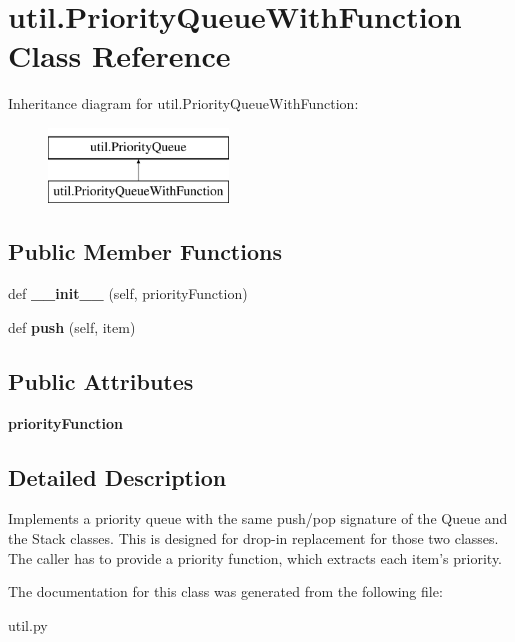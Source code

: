 \hypertarget{classutil_1_1_priority_queue_with_function}{}\section{util.\+Priority\+Queue\+With\+Function Class Reference}
\label{classutil_1_1_priority_queue_with_function}
Inheritance diagram for util.\+Priority\+Queue\+With\+Function\+:\begin{figure}[H]
\begin{center}
\leavevmode
\includegraphics[height=2.000000cm]{classutil_1_1_priority_queue_with_function}
\end{center}
\end{figure}
\subsection*{Public Member Functions}
\begin{DoxyCompactItemize}
\item 
\mbox{\label{classutil_1_1_priority_queue_with_function_a27ea0d044a098275fb4156ac4e35fcc2}} 
def {\bfseries \+\_\+\+\_\+init\+\_\+\+\_\+} (self, priority\+Function)
\item 
\mbox{\label{classutil_1_1_priority_queue_with_function_ababfbf747ff01219b5e03b06f7f30544}} 
def {\bfseries push} (self, item)
\end{DoxyCompactItemize}
\subsection*{Public Attributes}
\begin{DoxyCompactItemize}
\item 
\mbox{\label{classutil_1_1_priority_queue_with_function_a596184d513305b42e0a7a05f75fd7108}} 
{\bfseries priority\+Function}
\end{DoxyCompactItemize}


\subsection{Detailed Description}
\begin{DoxyVerb}Implements a priority queue with the same push/pop signature of the
Queue and the Stack classes. This is designed for drop-in replacement for
those two classes. The caller has to provide a priority function, which
extracts each item's priority.
\end{DoxyVerb}
 

The documentation for this class was generated from the following file\+:\begin{DoxyCompactItemize}
\item 
util.\+py\end{DoxyCompactItemize}
